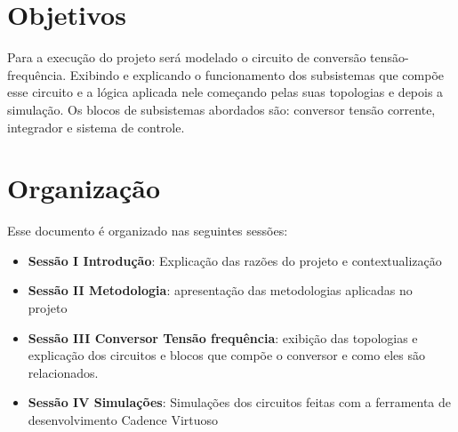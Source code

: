 \section{Objetivos}

 Para a execução do projeto será modelado o circuito de conversão tensão-frequência. Exibindo e explicando o funcionamento dos subsistemas que compõe esse circuito e a lógica aplicada nele começando pelas suas topologias e depois a simulação. Os blocos de subsistemas abordados são: conversor tensão corrente, integrador e sistema de controle.

\section{Organização}

Esse documento é organizado nas seguintes sessões:
\begin{itemize}
	\item \textbf{Sessão I Introdução}: Explicação das razões do projeto e contextualização
	\item \textbf{Sessão II Metodologia}: apresentação das metodologias aplicadas no projeto
	\item \textbf{Sessão III Conversor Tensão frequência}: exibição das topologias e explicação dos circuitos e blocos que compõe o conversor e como eles são relacionados.
	\item \textbf{Sessão IV Simulações}: Simulações dos circuitos feitas com a ferramenta de desenvolvimento Cadence Virtuoso
\end{itemize}




